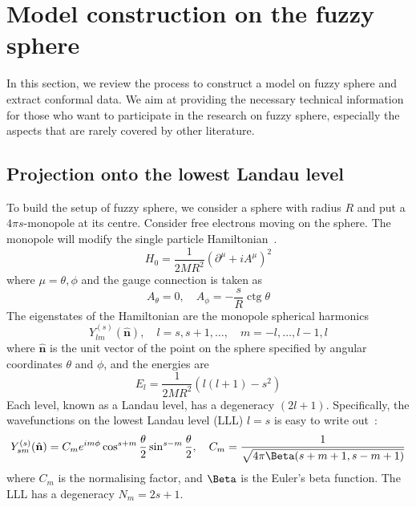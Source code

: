 \documentclass{timesjhep}
\begin{document}
\section{Model construction on the fuzzy sphere}
\label{sec:construct}

In this section, we review the process to construct a model on fuzzy sphere and extract conformal data. We aim at providing the necessary technical information for those who want to participate in the research on fuzzy sphere, especially the aspects that are rarely covered by other literature. 

\subsection{Projection onto the lowest Landau level}
\label{sec:setup}

To build the setup of fuzzy sphere, we consider a sphere with radius $R$ and put a $4\pi s$-monopole at its centre. Consider free electrons moving on the sphere. The monopole will modify the single particle Hamiltonian~\cite{Haldane1983LLL,Haldane1983LLL,Greiter2011LLL,Hasebe2010LLL}. 
\begin{equation}
    H_0=\frac{1}{2MR^2}(\partial^\mu+iA^\mu)^2
\end{equation} where $\mu=\theta,\phi$ and the gauge connection is taken as
\begin{equation}
    A_\theta=0,\quad A_\phi=-\frac{s}{R}\operatorname{ctg}\theta
\end{equation}
The eigenstates of the Hamiltonian are the monopole spherical harmonics 
\begin{equation}
    Y_{lm}^{(s)}(\hat{\mathbf{n}}),\quad l=s,s+1,\dots,\quad m=-l,\dots,l-1,l
\end{equation}
where $\hat{\mathbf{n}}$ is the unit vector of the point on the sphere specified by angular coordinates $\theta$ and $\phi$, and the energies are
\begin{equation}
    E_l=\frac{1}{2MR^2}(l(l+1)-s^2)
\end{equation}
Each level, known as a Landau level, has a degeneracy $(2l+1)$. Specifically, the wavefunctions on the lowest Landau level (LLL) $l=s$ is easy to write out~: 
\begin{equation}
    Y_{sm}^{(s)}(\hat{\mathbf{n}})=C_me^{im\phi}\cos^{s+m}\frac{\theta}{2}\sin^{s-m}\frac{\theta}{2},\quad C_m=\frac{1}{{\sqrt{4\pi\Beta(s+m+1,s-m+1)}}}
\end{equation}
where $C_m$ is the normalising factor, and $\Beta$ is the Euler's beta function. The LLL has a degeneracy $N_m=2s+1$. 
\end{document}
